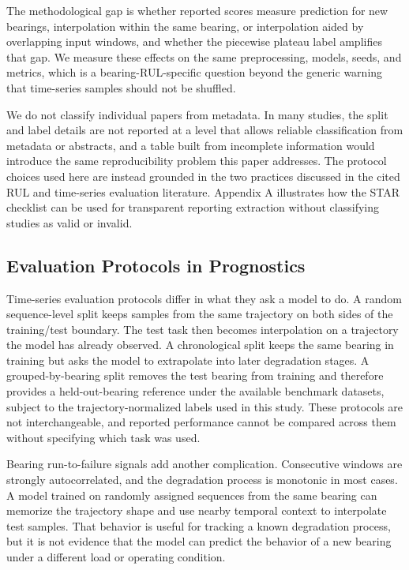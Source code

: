 \documentclass[pdflatex,sn-basic,NameDate]{sn-jnl}
\begin{document}
The methodological gap is whether reported scores measure prediction for new bearings, interpolation within the same bearing, or interpolation aided by overlapping input windows, and whether the piecewise plateau label amplifies that gap. We measure these effects on the same preprocessing, models, seeds, and metrics, which is a bearing-RUL-specific question beyond the generic warning that time-series samples should not be shuffled.

We do not classify individual papers from metadata. In many studies, the split and label details are not reported at a level that allows reliable classification from metadata or abstracts, and a table built from incomplete information would introduce the same reproducibility problem this paper addresses. The protocol choices used here are instead grounded in the two practices discussed in the cited RUL and time-series evaluation literature. Appendix A illustrates how the STAR checklist can be used for transparent reporting extraction without classifying studies as valid or invalid.

\subsection{Evaluation Protocols in Prognostics}
Time-series evaluation protocols differ in what they ask a model to do. A random sequence-level split keeps samples from the same trajectory on both sides of the training/test boundary. The test task then becomes interpolation on a trajectory the model has already observed. A chronological split keeps the same bearing in training but asks the model to extrapolate into later degradation stages. A grouped-by-bearing split removes the test bearing from training and therefore provides a held-out-bearing reference under the available benchmark datasets, subject to the trajectory-normalized labels used in this study. These protocols are not interchangeable, and reported performance cannot be compared across them without specifying which task was used.

Bearing run-to-failure signals add another complication. Consecutive windows are strongly autocorrelated, and the degradation process is monotonic in most cases. A model trained on randomly assigned sequences from the same bearing can memorize the trajectory shape and use nearby temporal context to interpolate test samples. That behavior is useful for tracking a known degradation process, but it is not evidence that the model can predict the behavior of a new bearing under a different load or operating condition.
\end{document}
